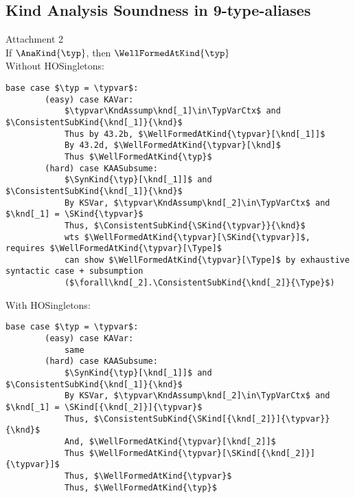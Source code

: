 \documentclass[12pt,fleqn]{article}
\renewcommand*{\TypVarCtx}{\Phi}
\begin{document}
\newpage
    
    
    \subsection*{Kind Analysis Soundness in 9-type-aliases}
    Attachment 2 \\
    If $\AnaKind{\typ}$, then $\WellFormedAtKind{\typ}$ \\
    Without HOSingletons: \\
    \begin{lstlisting}[mathescape=true]
    base case $\typ = \typvar$:
        (easy) case KAVar:
            $\typvar\KndAssump\knd[_1]\in\TypVarCtx$ and $\ConsistentSubKind{\knd[_1]}{\knd}$
            Thus by 43.2b, $\WellFormedAtKind{\typvar}[\knd[_1]]$
            By 43.2d, $\WellFormedAtKind{\typvar}[\knd]$
            Thus $\WellFormedAtKind{\typ}$
        (hard) case KAASubsume:
            $\SynKind{\typ}[\knd[_1]]$ and $\ConsistentSubKind{\knd[_1]}{\knd}$
            By KSVar, $\typvar\KndAssump\knd[_2]\in\TypVarCtx$ and $\knd[_1] = \SKind{\typvar}$
            Thus, $\ConsistentSubKind{\SKind{\typvar}}{\knd}$
            wts $\WellFormedAtKind{\typvar}[\SKind{\typvar}]$, requires $\WellFormedAtKind{\typvar}[\Type]$
            can show $\WellFormedAtKind{\typvar}[\Type]$ by exhaustive syntactic case + subsumption
            ($\forall\knd[_2].\ConsistentSubKind{\knd[_2]}{\Type}$)
    \end{lstlisting}
    With HOSingletons: \\
    \begin{lstlisting}[mathescape=true]
    base case $\typ = \typvar$:
        (easy) case KAVar:
            same
        (hard) case KAASubsume:
            $\SynKind{\typ}[\knd[_1]]$ and $\ConsistentSubKind{\knd[_1]}{\knd}$
            By KSVar, $\typvar\KndAssump\knd[_2]\in\TypVarCtx$ and $\knd[_1] = \SKind[{\knd[_2]}]{\typvar}$
            Thus, $\ConsistentSubKind{\SKind[{\knd[_2]}]{\typvar}}{\knd}$
            And, $\WellFormedAtKind{\typvar}[\knd[_2]]$
            Thus $\WellFormedAtKind{\typvar}[\SKind[{\knd[_2]}]{\typvar}]$
            Thus, $\WellFormedAtKind{\typvar}$
            Thus, $\WellFormedAtKind{\typ}$
    \end{lstlisting}
\end{document}
